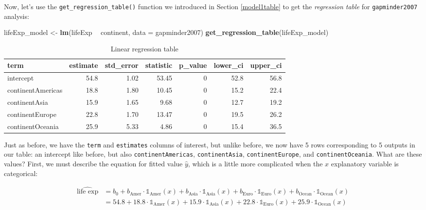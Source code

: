 \documentclass[12pt,]{krantz}
\makeatletter
\newenvironment{Shaded}{\begin{snugshade}}{\end{snugshade}}
\newcommand{\KeywordTok}[1]{\textcolor[rgb]{0.27,0.27,0.27}{\textbf{#1}}}
\newcommand{\DataTypeTok}[1]{\textcolor[rgb]{0.27,0.27,0.27}{#1}}
\newcommand{\StringTok}[1]{\textcolor[rgb]{0.5,0.5,0.5}{#1}}
\newcommand{\OperatorTok}[1]{\textcolor[rgb]{0.43,0.43,0.43}{\textbf{#1}}}
\newcommand{\NormalTok}[1]{#1}
\newenvironment{kframe}{%
\medskip{}
\setlength{\fboxsep}{.8em}
 \def\at@end@of@kframe{}%
 \ifinner\ifhmode%
  \def\at@end@of@kframe{\end{minipage}}%
  \begin{minipage}{\columnwidth}%
 \fi\fi%
 \def\FrameCommand##1{\hskip\@totalleftmargin \hskip-\fboxsep
 \colorbox{shadecolor}{##1}\hskip-\fboxsep
     \hskip-\linewidth \hskip-\@totalleftmargin \hskip\columnwidth}%
 \MakeFramed {\advance\hsize-\width
   \@totalleftmargin\z@ \linewidth\hsize
   \@setminipage}}%
 {\par\unskip\endMakeFramed%
 \at@end@of@kframe}
\renewenvironment{Shaded}{\begin{kframe}}{\end{kframe}}
\theoremstyle{definition}
\theoremstyle{definition}
\theoremstyle{definition}
\theoremstyle{remark}
\makeatother
\begin{document}
Now, let's use the \texttt{get\_regression\_table()} function we
introduced in Section \ref{model1table} to get the \emph{regression
table} for \texttt{gapminder2007} analysis:

\begin{Shaded}
\begin{Highlighting}[]
\NormalTok{lifeExp_model <-}\StringTok{ }\KeywordTok{lm}\NormalTok{(lifeExp }\OperatorTok{~}\StringTok{ }\NormalTok{continent, }\DataTypeTok{data =}\NormalTok{ gapminder2007)}
\KeywordTok{get_regression_table}\NormalTok{(lifeExp_model)}
\end{Highlighting}
\end{Shaded}

\begin{table}[H]

\caption{\label{tab:catxplot4b}Linear regression table}
\centering
\fontsize{10}{12}\selectfont
\begin{tabular}[t]{lrrrrrr}
\toprule
term & estimate & std\_error & statistic & p\_value & lower\_ci & upper\_ci\\
\midrule
intercept & 54.8 & 1.02 & 53.45 & 0 & 52.8 & 56.8\\
continentAmericas & 18.8 & 1.80 & 10.45 & 0 & 15.2 & 22.4\\
continentAsia & 15.9 & 1.65 & 9.68 & 0 & 12.7 & 19.2\\
continentEurope & 22.8 & 1.70 & 13.47 & 0 & 19.5 & 26.2\\
continentOceania & 25.9 & 5.33 & 4.86 & 0 & 15.4 & 36.5\\
\bottomrule
\end{tabular}
\end{table}

Just as before, we have the \texttt{term} and \texttt{estimates} columns
of interest, but unlike before, we now have 5 rows corresponding to 5
outputs in our table: an intercept like before, but also
\texttt{continentAmericas}, \texttt{continentAsia},
\texttt{continentEurope}, and \texttt{continentOceania}. What are these
values? First, we must describe the equation for fitted value
\(\widehat{y}\), which is a little more complicated when the \(x\)
explanatory variable is categorical:

\begin{align}
\widehat{\text{life exp}} &= b_0 + b_{\text{Amer}}\cdot\mathbb{1}_{\mbox{Amer}}(x) + b_{\text{Asia}}\cdot\mathbb{1}_{\mbox{Asia}}(x)
+ b_{\text{Euro}}\cdot\mathbb{1}_{\mbox{Euro}}(x) + b_{\text{Ocean}}\cdot\mathbb{1}_{\mbox{Ocean}}(x)\\
&= 54.8 + 18.8\cdot\mathbb{1}_{\mbox{Amer}}(x) + 15.9\cdot\mathbb{1}_{\mbox{Asia}}(x)
+ 22.8\cdot\mathbb{1}_{\mbox{Euro}}(x) + 25.9\cdot\mathbb{1}_{\mbox{Ocean}}(x)
\end{align}
\end{document}
